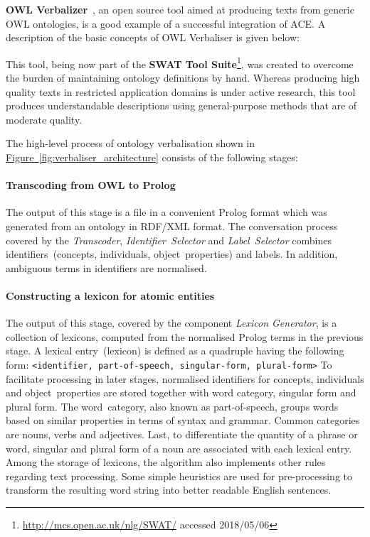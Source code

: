 \documentclass[draft,final]{vutinfth} %
\begin{document}
\textbf{OWL Verbalizer}~\cite{stevens2011}, an open source tool aimed at producing texts from generic OWL ontologies, is a good example of a successful integration of ACE. A description of the basic concepts of OWL Verbaliser is given below:

This tool, being now part of the \textbf{SWAT Tool Suite}\footnote{\url{http://mcs.open.ac.uk/nlg/SWAT/} accessed 2018/05/06}, was created to overcome the burden of maintaining ontology definitions by hand. Whereas producing high quality texts in restricted application domains is under active research, this tool produces understandable descriptions using general-purpose methods that are of moderate quality.

The high-level process of ontology verbalisation shown in \hyperref[fig:verbaliser_architecture]{Figure~\ref*{fig:verbaliser_architecture}} consists of the following stages:

\paragraph{Transcoding from OWL to Prolog} The output of this stage is a file in a convenient Prolog format which was generated from an ontology in RDF/XML format. The conversation process covered by the \textit{Transcoder}, \textit{Identifier~Selector} and \textit{Label~Selector} combines identifiers~(concepts, individuals, object~properties) and labels. In addition, ambiguous terms in identifiers are normalised. 

\paragraph{Constructing a lexicon for atomic entities} The output of this stage, covered by the component \textit{Lexicon Generator}, is a collection of lexicons, computed from the normalised Prolog terms in the previous stage. A lexical entry~(lexicon) is defined as a quadruple having the following form: \texttt{<identifier, part-of-speech, singular-form, plural-form>} To facilitate processing in later stages, normalised identifiers for concepts, individuals and object~properties are stored together with word category, singular form and plural form. The word~category, also known as part-of-speech, groups words based on similar properties in terms of syntax and grammar. Common categories are nouns, verbs and adjectives. Last, to differentiate the quantity of a phrase or word, singular and plural form of a noun are associated with each lexical entry. 
Among the storage of lexicons, the algorithm also implements other rules regarding text processing. Some simple heuristics are used for pre-processing to transform the resulting word string into better readable English sentences. 
\end{document}
